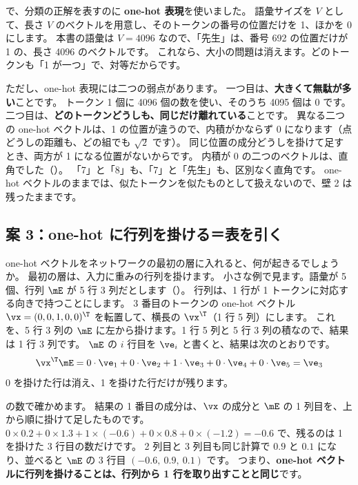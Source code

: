 で、分類の正解を表すのに \textbf{one-hot 表現}を使いました。
語彙サイズを $V$ として、長さ $V$ のベクトルを用意し、そのトークンの番号の位置だけを 1、ほかを 0 にします。
本書の語彙は $V=4096$ なので、「先生」は、番号 692 の位置だけが 1 の、長さ 4096 のベクトルです。
これなら、大小の問題は消えます。どのトークンも「1 が一つ」で、対等だからです。

ただし、one-hot 表現には二つの弱点があります。
一つ目は、\textbf{大きくて無駄が多い}ことです。
トークン 1 個に 4096 個の数を使い、そのうち 4095 個は 0 です。
二つ目は、\textbf{どのトークンどうしも、同じだけ離れている}ことです。
異なる二つの one-hot ベクトルは、1 の位置が違うので、内積がかならず 0 になります（点どうしの距離も、どの組でも $\sqrt{2}$ です）。
同じ位置の成分どうしを掛けて足すとき、両方が 1 になる位置がないからです。
内積が 0 の二つのベクトルは、直角でした（）。
「7」と「8」も、「7」と「先生」も、区別なく直角です。
one-hot ベクトルのままでは、似たトークンを似たものとして扱えないので、壁 2 は残ったままです。

\subsection*{案 3：one-hot に行列を掛ける＝表を引く}

one-hot ベクトルをネットワークの最初の層に入れると、何が起きるでしょうか。
最初の層は、入力に重みの行列を掛けます。
小さな例で見ます。語彙が 5 個、行列 $\mE$ が 5 行 3 列だとします（）。
行列は、1 行が 1 トークンに対応する向きで持つことにします。
3 番目のトークンの one-hot ベクトル $\vx=(0,0,1,0,0)^\T$ を転置して、横長の $\vx^\T$（1 行 5 列）にします。
これを、5 行 3 列の $\mE$ に左から掛けます。1 行 5 列と 5 行 3 列の積なので、結果は 1 行 3 列です。
$\mE$ の $i$ 行目を $\ve_i$ と書くと、結果は次のとおりです。
\begin{equation}
\vx^\T\mE = 0\cdot\ve_1 + 0\cdot\ve_2 + 1\cdot\ve_3 + 0\cdot\ve_4 + 0\cdot\ve_5 = \ve_3
\label{eq:emb-onehot}
\end{equation}
0 を掛けた行は消え、1 を掛けた行だけが残ります。

の数で確かめます。
結果の 1 番目の成分は、$\vx$ の成分と $\mE$ の 1 列目を、上から順に掛けて足したものです。
$0\times0.2+0\times1.3+1\times(-0.6)+0\times0.8+0\times(-1.2)=-0.6$ で、残るのは 1 を掛けた 3 行目の数だけです。
2 列目と 3 列目も同じ計算で $0.9$ と $0.1$ になり、並べると $\mE$ の 3 行目 $(-0.6,\ 0.9,\ 0.1)$ です。
つまり、\textbf{one-hot ベクトルに行列を掛けることは、行列から 1 行を取り出すことと同じ}です。

